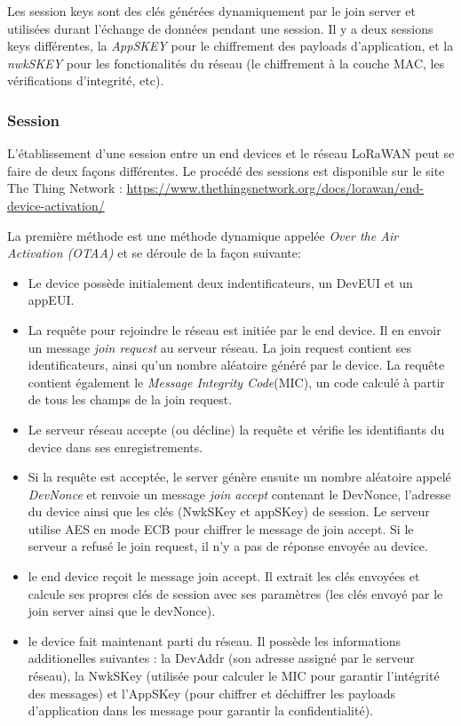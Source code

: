 Les session keys sont des clés générées dynamiquement par le join server et utilisées durant l'échange de données pendant une session. Il y a deux sessions keys différentes, la \textit{AppSKEY} pour le chiffrement des payloads d'application, et la \textit{nwkSKEY} pour les fonctionalités du réseau (le chiffrement à la couche MAC, les vérifications d'integrité, etc).

\subsubsection{Session}

L'établissement d'une session entre un end devices et le réseau LoRaWAN peut se faire de deux façons différentes. Le procédé des sessions est disponible sur le site The Thing Network : \href{https://www.thethingsnetwork.org/docs/lorawan/end-device-activation/}{https://www.thethingsnetwork.org/docs/lorawan/end-device-activation/}

La première méthode est une méthode dynamique appelée \textit{Over the Air Activation (OTAA)} et se déroule de la façon suivante: 
\begin{itemize}
\item Le device possède initialement deux indentificateurs, un DevEUI et un appEUI.
\item La requête pour rejoindre le réseau est initiée par le end device. Il en envoir un message \textit{join request} au serveur réseau. La join request contient ses identificateurs, ainsi qu'un nombre aléatoire généré par le device. La requête contient également le \textit{Message Integrity Code}(MIC), un code calculé à partir de tous les champs de la join request.
\item Le serveur réseau accepte (ou décline) la requête et vérifie les identifiants du device dans ses enregistrements.
\item Si la requête est acceptée, le server génère ensuite un nombre aléatoire appelé \textit{DevNonce} et renvoie un message \textit{join accept} contenant le DevNonce, l'adresse du device ainsi que les clés (NwkSKey et appSKey) de session. Le serveur utilise AES en mode ECB pour chiffrer le message de join accept. Si le serveur a refusé le join request, il n'y a pas de réponse envoyée au device.
\item le end device reçoit le message join accept. Il extrait les clés envoyées et calcule ses propres clés de session avec ses paramètres (les clés envoyé par le join server ainsi que le devNonce).
\item le device fait maintenant parti du réseau. Il possède les informations additionelles suivantes : la DevAddr (son adresse assigné par le serveur réseau), la NwkSKey (utilisée pour calculer le MIC pour garantir l'intégrité des messages) et l'AppSKey (pour chiffrer et déchiffrer les payloads d'application dans les message pour garantir la confidentialité).
\end{itemize}
        
